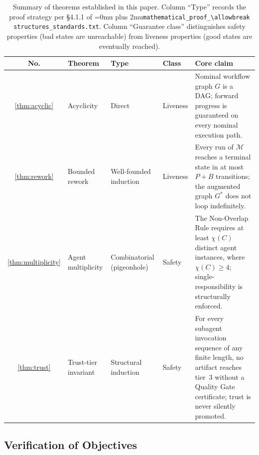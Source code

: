 \documentclass[12pt]{article}
\theoremstyle{definition}
\DeclareRobustCommand{\code}[1]{\begingroup\Urlmuskip=0mu plus 2mu\relax\nolinkurl{#1}\endgroup}
\newcommand{\ProofStd}{\code{mathematical\_proof\_\allowbreak structures\_standards.txt}}
\begin{document}
\begin{table}[H]
\centering
\caption{Summary of theorems established in this paper.
         Column ``Type'' records the proof strategy
         per \S4.1.1 of \ProofStd{}.
         Column ``Guarantee class'' distinguishes safety
         properties (bad states are unreachable) from
         liveness properties (good states are eventually reached).}
\label{tab:thm-summary}
\small
\begin{tabular}{@{}clllp{4.8cm}@{}}
\toprule
\textbf{No.} & \textbf{Theorem} & \textbf{Type} &
\textbf{Class} & \textbf{Core claim} \\
\midrule
\ref{thm:acyclic}
  & Acyclicity
  & Direct
  & Liveness
  & Nominal workflow graph $G$ is a DAG; forward
    progress is guaranteed on every nominal
    execution path. \\[4pt]
\ref{thm:rework}
  & Bounded rework
  & Well-founded induction
  & Liveness
  & Every run of $\mathcal{M}$ reaches a terminal
    state in at most $P + B$ transitions; the
    augmented graph $G^{*}$ does not loop
    indefinitely. \\[4pt]
\ref{thm:multiplicity}
  & Agent multiplicity
  & Combinatorial (pigeonhole)
  & Safety
  & The Non-Overlap Rule requires at least
    $\chi(C)$ distinct agent instances, where
    $\chi(C) \geq 4$; single-responsibility
    is structurally enforced. \\[4pt]
\ref{thm:trust}
  & Trust-tier invariant
  & Structural induction
  & Safety
  & For every subagent invocation sequence of
    any finite length, no artifact reaches
    tier~3 without a Quality Gate certificate;
    trust is never silently promoted. \\
\bottomrule
\end{tabular}
\end{table}

\subsection{Verification of Objectives}
\label{sec:conclusion:objectives}
\end{document}
